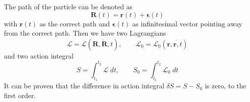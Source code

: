 \documentclass[../../../main.tex]{subfiles}
\begin{document}
The path of the particle can be denoted as
\begin{equation*}
	\mathbf{R}(t)=\mathbf{r}(t)+\boldsymbol{\epsilon}(t)
\end{equation*}
with $\mathbf{r}(t)$ as the correct path and $\boldsymbol{\epsilon}(t)$ as infinitesimal vector pointing away from the correct path.
Then we have two Lagrangians
\begin{equation*}
	\mathcal{L}=\mathcal{L}(\mathbf{R},\dot{\mathbf{R}},t),\qquad
	\mathcal{L}_0=\mathcal{L}_0(\mathbf{r},\dot{\mathbf{r},t})
\end{equation*}
and two action integral
\begin{equation*}
	S=\int_{t_1}^{t_2}\mathcal{L}\;dt,\qquad S_0=\int_{t_1}^{t_2}\mathcal{L}_0\;dt
\end{equation*}
It can be proven that the difference in action integral $\delta S=S-S_0$ is zero, to the first order.
\end{document}
